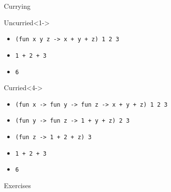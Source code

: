 \documentclass{beamer}
\newcommand{\code}[1]{\texttt{#1}}
\begin{document}
    \begin{frame}{Currying}
        \begin{block}{Uncurried}<1->
            \begin{itemize}
                \item<1-> \code{(fun x y z -> x + y + z) 1 2 3}
                \item<2-> \code{1 + 2 + 3}
                \item<3-> \code{6}
            \end{itemize}
        \end{block}

        \begin{block}{Curried}<4->
            \begin{itemize}
                \item<4-> \code{(fun x -> fun y -> fun z -> x + y + z) 1 2 3} 
                \item<5-> \code{(fun y -> fun z -> 1 + y + z) 2 3}
                \item<6-> \code{(fun z -> 1 + 2 + z) 3}
                \item<7-> \code{1 + 2 + 3}
                \item<8-> \code{6}
            \end{itemize} 
        \end{block}
    \end{frame}

    \begin{frame}{Exercises}

    \end{frame}
\end{document}
